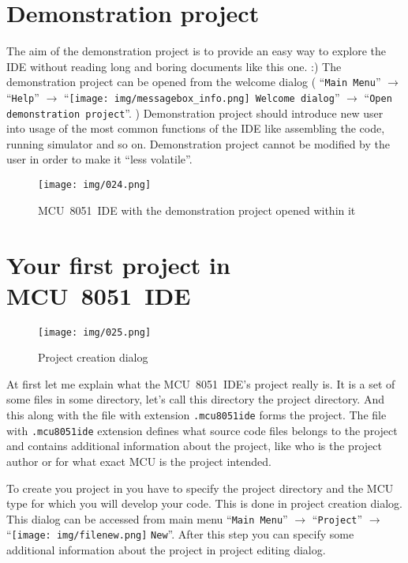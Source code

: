 \documentclass[a4paper,twoside,12pt]{book}
\newcommand{\menuitem}[1]{\texttt{#1}}
\newcommand{\fileextension}[1]{\texttt{#1}}
\begin{document}
	\section{Demonstration project}
		The aim of the demonstration project is to provide an easy way to explore the IDE without reading long and boring documents like this one. :) The demonstration project can be opened from the welcome dialog ( ``\menuitem{Main Menu}'' $\rightarrow$ ``\menuitem{Help}'' $\rightarrow$ ``\texttt{[image: img/messagebox\_info.png]}~\menuitem{Welcome dialog}'' $\rightarrow$ ``\menuitem{Open demonstration project}''. ) Demonstration project should introduce new user into usage of the most common functions of the IDE like assembling the code, running simulator and so on. Demonstration project cannot be modified by the user in order to make it ``less volatile''.
		\begin{figure}[h!]
			\centering{}
			\texttt{[image: img/024.png]}
			\caption{MCU~8051~IDE with the demonstration project opened within it}
		\end{figure}

	\section{Your first project in MCU~8051~IDE}
		\begin{wrapfigure}{r}{160pt}
			\centering{}
			\texttt{[image: img/025.png]}
			\caption{Project creation dialog}
		\end{wrapfigure}
		At first let me explain what the MCU~8051~IDE's project really is. It is a set of some files in some directory, let's call this directory the project directory. And this along with the file with extension \fileextension{.mcu8051ide} forms the project. The file with \fileextension{.mcu8051ide} extension defines what source code files belongs to the project and contains additional information about the project, like who is the project author or for what exact MCU is the project intended.

		To create you project in you have to specify the project directory and the MCU type for which you will develop your code. This is done in project creation dialog. This dialog can be accessed from main menu ``\menuitem{Main Menu}'' $\rightarrow$ ``\menuitem{Project}'' $\rightarrow$ ``\texttt{[image: img/filenew.png]} \menuitem{New}''. After this step you can specify some additional information about the project in project editing dialog.
\end{document}
